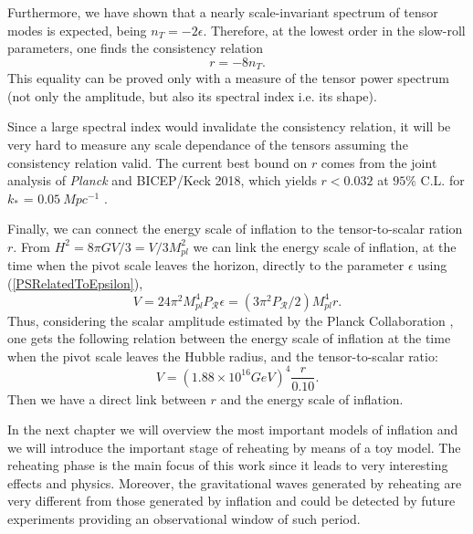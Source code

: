 \documentclass[11pt,a4paper,twoside]{book}
\begin{document}
Furthermore, we have shown that a nearly scale-invariant spectrum of tensor modes is expected, being $ n_{T}=-2\epsilon $. Therefore, at the lowest order in the slow-roll parameters, one finds the consistency relation
\begin{equation}
	\label{consistencyRelation}
	r=-8n_{T}.
\end{equation}
This equality can be proved only with a measure of the tensor power spectrum (not only the amplitude, but also  its spectral index i.e. its shape).

Since a large spectral index would invalidate the consistency relation, it will be very hard to measure any scale dependance of the tensors assuming the consistency relation valid.
The current best bound on $ \textit{r} $ comes from the joint analysis of \textit{Planck} and BICEP/Keck 2018, which yields $ r < 0.032 $ at $ 95 \% $ C.L. for $ k_{*}$ = $ 0.05\ Mpc^{-1} $ \cite{Intro:ConstraintsOnr}. 

Finally, we can connect the energy scale of inflation to the tensor-to-scalar ration $ r $.
From $ H^{2}=8\pi GV/3 = V/3M_{pl}^{2}$ we can link the energy scale of inflation, at the time when the pivot scale leaves the horizon, directly to the parameter $\epsilon$ using (\ref{PSRelatedToEpsilon}),
\begin{equation}
	V=24\pi^{2}M_{pl}^{4}P_{\mathcal{R}}\epsilon =(3\pi^{2}P_{\mathcal{R}}/2)M_{pl}^{4}r.
\end{equation}
Thus, considering  the scalar amplitude estimated  by the Planck Collaboration \cite{Plank2015:Chap1}, one gets  the following relation between the energy scale of inflation at the time when the pivot scale leaves the Hubble radius, and the tensor-to-scalar ratio:
\begin{equation}
	\label{energyScaleInflation-r}
	V=(1.88\times10^{16}GeV)^{4}\frac{r}{0.10}.
\end{equation}
Then we have a direct link between $ r $ and the energy scale of inflation.

In the next chapter we will overview the most important models of inflation and we will introduce the important stage of reheating by means of a toy model.
The reheating phase is the main focus of this work since it leads to very interesting effects and physics. Moreover, the gravitational waves generated by reheating are very different from those generated by inflation and could be detected by future experiments providing an observational window of such period.
\end{document}

